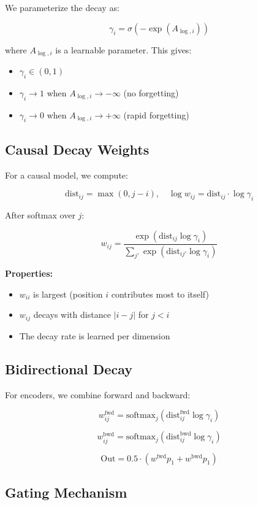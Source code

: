 We parameterize the decay as:

\[
\gamma_i = \sigma(-\exp(A_{\log, i}))
\tag{3.7}
\]

where $A_{\log, i}$ is a learnable parameter. This gives:

\begin{itemize}
\item $\gamma_i \in (0, 1)$
\item $\gamma_i \to 1$ when $A_{\log, i} \to -\infty$ (no forgetting)
\item $\gamma_i \to 0$ when $A_{\log, i} \to +\infty$ (rapid forgetting)

\end{itemize}
\subsection{Causal Decay Weights}

For a causal model, we compute:

\[
\text{dist}_{ij} = \max(0, j - i), \quad
\log w_{ij} = \text{dist}_{ij} \cdot \log \gamma_i
\tag{3.8}
\]

After softmax over $j$:

\[
w_{ij} = \frac{\exp(\text{dist}_{ij} \log \gamma_i)}{\sum_{j'} \exp(\text{dist}_{ij'} \log \gamma_i)}
\tag{3.9}
\]

\textbf{Properties:}
\begin{itemize}
\item $w_{ii}$ is largest (position $i$ contributes most to itself)
\item $w_{ij}$ decays with distance $|i - j|$ for $j < i$
\item The decay rate is learned per dimension

\end{itemize}
\subsection{Bidirectional Decay}

For encoders, we combine forward and backward:

\[
w_{ij}^\text{fwd} = \text{softmax}_j(\text{dist}_{ij}^\text{fwd} \log \gamma_i)
\tag{3.10}
\]

\[
w_{ij}^\text{bwd} = \text{softmax}_j(\text{dist}_{ij}^\text{bwd} \log \gamma_i)
\tag{3.11}
\]

\[
\text{Out} = 0.5 \cdot (w^\text{fwd} p_1 + w^\text{bwd} p_1)
\tag{3.12}
\]

\subsection{Gating Mechanism}

